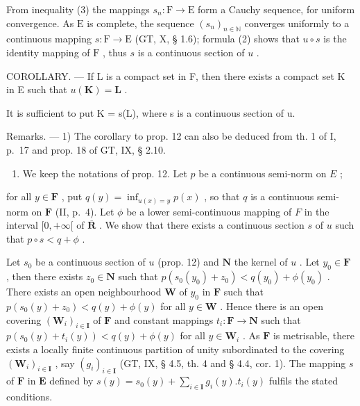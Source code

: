From inequality (3) the mappings \(s_n: \mathrm{F} \to \mathrm{E}\) form a Cauchy sequence, for uniform convergence. As \(\mathrm{E}\) is complete, the sequence \((s_n)_{n \in \mathbb{N}}\) converges uniformly to a continuous mapping \(s: \mathrm{F} \to \mathrm{E}\) (GT, X, § 1.6); formula (2) shows that \(u \circ s\) is the identity mapping of \(\mathrm{F}\) , thus \(s\) is a continuous section of \(u\) .

COROLLARY. --- If L is a compact set in F, then there exists a compact set K in E such that \(u(\mathbf{K}) = \mathbf{L}\) .

It is sufficient to put K = s(L), where s is a continuous section of u.

Remarks. --- 1) The corollary to prop. 12 can also be deduced from th. 1 of I, p.~17 and prop. 18 of GT, IX, § 2.10.

\begin{enumerate}
\def\labelenumi{\arabic{enumi})}
\setcounter{enumi}{1}
\tightlist
\item
  We keep the notations of prop. 12. Let \(p\) be a continuous semi-norm on \(E\) ;
\end{enumerate}

for all \(y \in \mathbf{F}\) , put \(q(y) = \inf_{u(x) = y} p(x)\) , so that \(q\) is a continuous semi-norm on \(\mathbf{F}\) (II, p.~4). Let \(\phi\) be a lower semi-continuous mapping of \(F\) in the interval \([0, +\infty[\) of \(\overline{\mathbf{R}}\) . We show that there exists a continuous section \(s\) of \(u\) such that \(p \circ s < q + \phi\) .

Let \(s_0\) be a continuous section of \(u\) (prop. 12) and \(\mathbf{N}\) the kernel of \(u\) . Let \(y_0 \in \mathbf{F}\) , then there exists \(z_0 \in \mathbf{N}\) such that \(p(s_0(y_0) + z_0) < q(y_0) + \phi(y_0)\) . There exists an open neighbourhood \(\mathbf{W}\) of \(y_0\) in \(\mathbf{F}\) such that \(p(s_0(y) + z_0) < q(y) + \phi(y)\) for all \(y \in \mathbf{W}\) . Hence there is an open covering \((\mathbf{W}_i)_{i \in \mathbf{I}}\) of \(\mathbf{F}\) and constant mappings \(t_i: \mathbf{F} \to \mathbf{N}\) such that \(p(s_0(y) + t_i(y)) < q(y) + \phi(y)\) for all \(y \in \mathbf{W}_i\) . As \(\mathbf{F}\) is metrisable, there exists a locally finite continuous partition of unity subordinated to the covering \((\mathbf{W}_i)_{i \in \mathbf{I}}\) , say \((g_i)_{i \in \mathbf{I}}\) (GT, IX, § 4.5, th. 4 and § 4.4, cor. 1). The mapping \(s\) of \(\mathbf{F}\) in \(\mathbf{E}\) defined by \(s(y) = s_0(y) + \sum_{i \in \mathbf{I}} g_i(y). t_i(y)\) fulfils the stated conditions.

